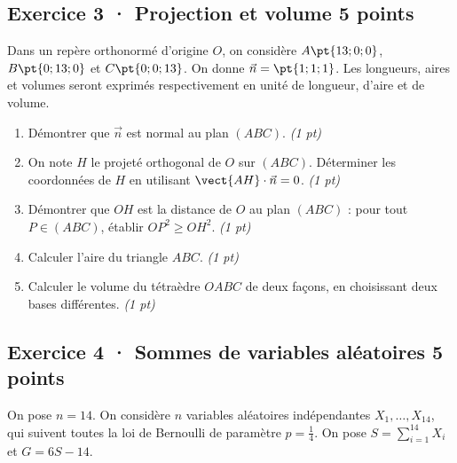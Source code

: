 \mxnewpage{}

\subsection*{Exercice 3 · Projection et volume \hfill 5 points}Dans un repère orthonormé d'origine $O$, on considère $A\pt{13;0;0}$, $B\pt{0;13;0}$ et $C\pt{0;0;13}$. On donne $\vec n=\pt{1;1;1}$. Les longueurs, aires et volumes seront exprimés respectivement en unité de longueur, d'aire et de volume.

\begin{enumerate}

\item Démontrer que $\vec n$ est normal au plan $(ABC)$. \hfill\textit{(1 pt)}

\item On note $H$ le projeté orthogonal de $O$ sur $(ABC)$. Déterminer les coordonnées de $H$ en utilisant $\vect{AH}\cdot\vec n=0$. \hfill\textit{(1 pt)}

\item Démontrer que $OH$ est la distance de $O$ au plan $(ABC)$ : pour tout $P\in(ABC)$, établir $OP^2\ge OH^2$. \hfill\textit{(1 pt)}

\item Calculer l'aire du triangle $ABC$. \hfill\textit{(1 pt)}

\item Calculer le volume du tétraèdre $OABC$ de deux façons, en choisissant deux bases différentes. \hfill\textit{(1 pt)}

\end{enumerate}

\subsection*{Exercice 4 · Sommes de variables aléatoires \hfill 5 points}On pose $n=14$. On considère $n$ variables aléatoires indépendantes $X_1,\ldots,X_{14}$, qui suivent toutes la loi de Bernoulli de paramètre $p=\frac{1}{4}$. On pose $S=\displaystyle\sum_{i=1}^{14}X_i$ et $G=6S-14$.

